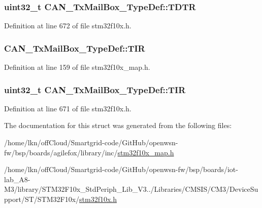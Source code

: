 \subsubsection[{\texorpdfstring{T\+D\+TR}{TDTR}}]{ {\bf uint32\+\_\+t} C\+A\+N\+\_\+\+Tx\+Mail\+Box\+\_\+\+Type\+Def\+::\+T\+D\+TR}\hypertarget{struct_c_a_n___tx_mail_box___type_def_a2351cb865d064cf75f61642aaa887f76}{}\label{struct_c_a_n___tx_mail_box___type_def_a2351cb865d064cf75f61642aaa887f76}


Definition at line 672 of file stm32f10x.\+h.

\subsubsection[{\texorpdfstring{T\+IR}{TIR}}]{ C\+A\+N\+\_\+\+Tx\+Mail\+Box\+\_\+\+Type\+Def\+::\+T\+IR}\hypertarget{struct_c_a_n___tx_mail_box___type_def_a4fb05cb75703b682f1be00b216a5e466}{}\label{struct_c_a_n___tx_mail_box___type_def_a4fb05cb75703b682f1be00b216a5e466}


Definition at line 159 of file stm32f10x\+\_\+map.\+h.

\subsubsection[{\texorpdfstring{T\+IR}{TIR}}]{ {\bf uint32\+\_\+t} C\+A\+N\+\_\+\+Tx\+Mail\+Box\+\_\+\+Type\+Def\+::\+T\+IR}\hypertarget{struct_c_a_n___tx_mail_box___type_def_a22f525c909de2dcec1d4093fe1d562b8}{}\label{struct_c_a_n___tx_mail_box___type_def_a22f525c909de2dcec1d4093fe1d562b8}


Definition at line 671 of file stm32f10x.\+h.



The documentation for this struct was generated from the following files\+:\begin{DoxyCompactItemize}
\item 
/home/lkn/off\+Cloud/\+Smartgrid-\/code/\+Git\+Hub/openwsn-\/fw/bsp/boards/agilefox/library/inc/\hyperlink{agilefox_2library_2inc_2stm32f10x__map_8h}{stm32f10x\+\_\+map.\+h}\item 
/home/lkn/off\+Cloud/\+Smartgrid-\/code/\+Git\+Hub/openwsn-\/fw/bsp/boards/iot-\/lab\+\_\+\+A8-\/\+M3/library/\+S\+T\+M32\+F10x\+\_\+\+Std\+Periph\+\_\+\+Lib\+\_\+\+V3../\+Libraries/\+C\+M\+S\+I\+S/\+C\+M3/\+Device\+Support/\+S\+T/\+S\+T\+M32\+F10x/\hyperlink{iot-lab___a8-_m3_2library_2_s_t_m32_f10x___std_periph___lib___v3_85_80_2_libraries_2_c_m_s_i_s_26497265545392eb5694b064ae15018db}{stm32f10x.\+h}\end{DoxyCompactItemize}
